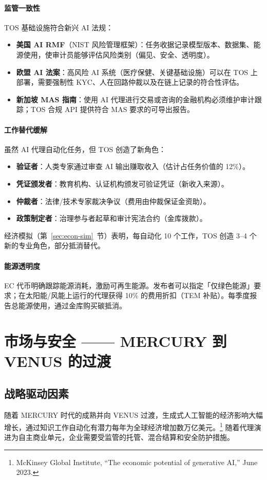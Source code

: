\documentclass[11pt]{article}
\begin{document}
\paragraph{监管一致性} TOS 基础设施符合新兴 AI 法规：
\begin{itemize}[noitemsep]
  \item \textbf{美国 AI RMF}（NIST 风险管理框架）：任务收据记录模型版本、数据集、能源使用，使审计员能够评估风险类别（偏见、安全、透明度）。
  \item \textbf{欧盟 AI 法案}：高风险 AI 系统（医疗保健、关键基础设施）可以在 TOS 上部署，需要强制性 KYC、人在回路仲裁以及在链上记录的符合性评估。
  \item \textbf{新加坡 MAS 指南}：使用 AI 代理进行交易或咨询的金融机构必须维护审计跟踪；TOS 合规 API 提供符合 MAS 要求的可导出报告。
\end{itemize}

\paragraph{工作替代缓解} 虽然 AI 代理自动化任务，但 TOS 创造了新角色：
\begin{itemize}[noitemsep]
  \item \textbf{验证者}：人类专家通过审查 AI 输出赚取收入（估计占任务价值的 12\%）。
  \item \textbf{凭证颁发者}：教育机构、认证机构颁发可验证凭证（新收入来源）。
  \item \textbf{仲裁者}：法律/技术专家裁决争议（费用由仲裁保证金资助）。
  \item \textbf{政策制定者}：治理参与者起草和审计宪法合约（金库拨款）。
\end{itemize}
经济模拟（第~\ref{sec:econ-sim}~节）表明，每自动化 10 个工作，TOS 创造 3--4 个新的专业角色，部分抵消替代。

\paragraph{能源透明度} EC 代币明确跟踪能源消耗，激励可再生能源。发布者可以指定「仅绿色能源」要求；在太阳能/风能上运行的代理获得 10\% 的费用折扣（TEM 补贴）。每季度报告总能源使用，通过金库购买碳抵消。

\section{市场与安全 —— MERCURY 到 VENUS 的过渡}
\subsection{战略驱动因素}
随着 MERCURY 时代的成熟并向 VENUS 过渡，生成式人工智能的经济影响大幅增长，通过知识工作自动化有潜力每年为全球经济增加数万亿美元。\footnote{McKinsey Global Institute, ``The economic potential of generative AI,'' June 2023.} 随着代理演进为自主商业单元，企业需要受监管的托管、混合结算和安全防护措施。
\end{document}
